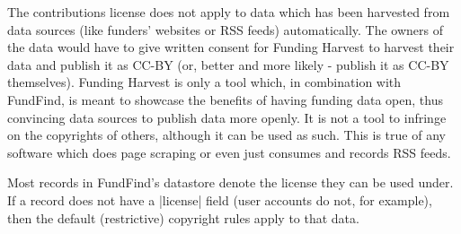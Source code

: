 The contributions license does not apply to data which has been harvested from data sources (like funders' websites or RSS feeds) automatically. The owners of the data would have to give written consent for Funding Harvest to harvest their data and publish it as CC-BY (or, better and more likely - publish it as CC-BY themselves). Funding Harvest is only a tool which, in combination with FundFind, is meant to showcase the benefits of having funding data open, thus convincing data sources to publish data more openly. It is not a tool to infringe on the copyrights of others, although it can be used as such. This is true of any software which does page scraping or even just consumes and records RSS feeds.

Most records in FundFind's datastore denote the license they can be used under. If a record does not have a |license| field (user accounts do not, for example), then the default (restrictive) copyright rules apply to that data.